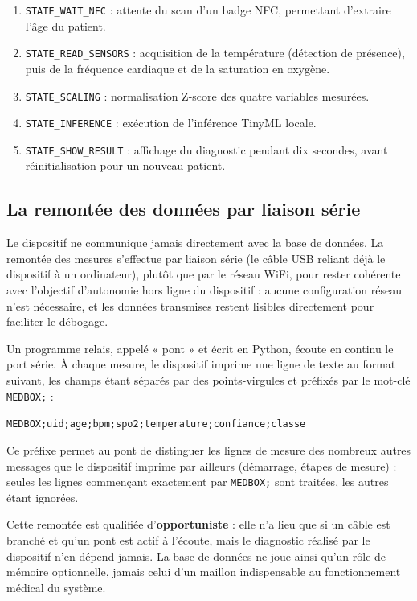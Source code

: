 \documentclass[12pt,a4paper]{report}
\begin{document}
\begin{enumerate}
    \item \texttt{STATE\_WAIT\_NFC} : attente du scan d'un badge NFC, permettant d'extraire l'âge du patient.
    \item \texttt{STATE\_READ\_SENSORS} : acquisition de la température (détection de présence), puis de la fréquence cardiaque et de la saturation en oxygène.
    \item \texttt{STATE\_SCALING} : normalisation Z-score des quatre variables mesurées.
    \item \texttt{STATE\_INFERENCE} : exécution de l'inférence TinyML locale.
    \item \texttt{STATE\_SHOW\_RESULT} : affichage du diagnostic pendant dix secondes, avant réinitialisation pour un nouveau patient.
\end{enumerate}

\subsection*{La remontée des données par liaison série}
Le dispositif ne communique jamais directement avec la base de données. La remontée des mesures s'effectue par liaison série (le câble USB reliant déjà le dispositif à un ordinateur), plutôt que par le réseau WiFi, pour rester cohérente avec l'objectif d'autonomie hors ligne du dispositif : aucune configuration réseau n'est nécessaire, et les données transmises restent lisibles directement pour faciliter le débogage.

Un programme relais, appelé « pont » et écrit en Python, écoute en continu le port série. À chaque mesure, le dispositif imprime une ligne de texte au format suivant, les champs étant séparés par des points-virgules et préfixés par le mot-clé \texttt{MEDBOX;} :
\begin{center}
\texttt{MEDBOX;uid;age;bpm;spo2;temperature;confiance;classe}
\end{center}

Ce préfixe permet au pont de distinguer les lignes de mesure des nombreux autres messages que le dispositif imprime par ailleurs (démarrage, étapes de mesure) : seules les lignes commençant exactement par \texttt{MEDBOX;} sont traitées, les autres étant ignorées.

Cette remontée est qualifiée d'\textbf{opportuniste} : elle n'a lieu que si un câble est branché et qu'un pont est actif à l'écoute, mais le diagnostic réalisé par le dispositif n'en dépend jamais. La base de données ne joue ainsi qu'un rôle de mémoire optionnelle, jamais celui d'un maillon indispensable au fonctionnement médical du système.
\end{document}
